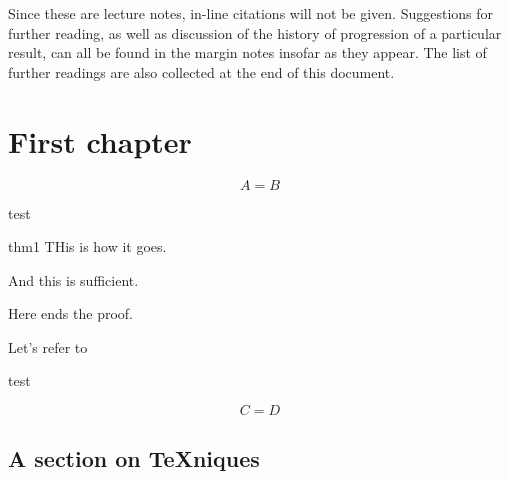 \documentclass[noocg]{wwwnotes2}
\begin{document}
\begin{thot}[Citations]
Since these are lecture notes, in-line citations will not be given. Suggestions for further reading, as well as discussion of the history of progression of a particular result, can all be found in the margin notes insofar as they appear. The list of further readings are also collected at the end of this document. 
\end{thot}


\tableofcontents

\chapter{First chapter}

\lipsum[1-2]


\begin{equation}
	A = B
\end{equation}

\begin{thm}
	\lipsum[27]

	test
\end{thm}

\lipsum[1]

\begin{pfof}{thm1}
THis is how it goes.
\begin{thot}[Step 1]
	\lipsum[9-10]

	And this is sufficient.
\end{thot}
Here ends the proof.
\end{pfof}

Let's refer to 

\begin{rmk}
	\lipsum[27]

	test
\end{rmk}

\begin{equation}
	C = D
\end{equation}

\section{A section on \TeX{}niques}
\end{document}
